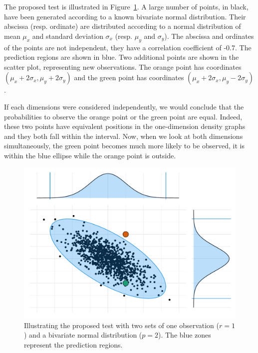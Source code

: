             The proposed test is illustrated in Figure~\ref{fig:non_regression:stat:single_point}. A large number of points,
            in black, have been generated according to a known bivariate normal distribution. Their abscissa (resp.
            ordinate) are distributed according to a normal distribution of mean \(\mu_x\) and standard deviation
            \(\sigma_x\) (resp. \(\mu_y\) and \(\sigma_y\)). The abscissa and ordinates of the points are not independent,
            they have a correlation coefficient of -0.7. The  prediction regions are shown in blue. Two
            additional points are shown in the scatter plot, representing new observations. The orange point has coordinates
            \((\mu_x+2\sigma_x,\mu_y+2\sigma_y)\) and the green point has coordinates \((\mu_x+2\sigma_x,\mu_y-2\sigma_y)\).

            If each dimensions were considered independently, we would conclude that the probabilities to observe the orange
            point or the green point are equal. Indeed, these two points have equivalent positions in the one-dimension
            density graphs and they both fall within the  interval. Now, when we look at both dimensions
            simultaneously, the green point becomes much more likely to be observed, it is within the blue ellipse while the
            orange point is outside.

            \begin{figure}[htpb]
                \centering
                \includegraphics[width=1\linewidth]{img/experiment/non_regression/statistics/single_point.pdf}
                \caption{Illustrating the proposed test with two sets of one observation (\(r=1\)) and a bivariate normal
                distribution (\(p=2\)). The blue zones represent the  prediction regions.}%
                \label{fig:non_regression:stat:single_point}
            \end{figure}

